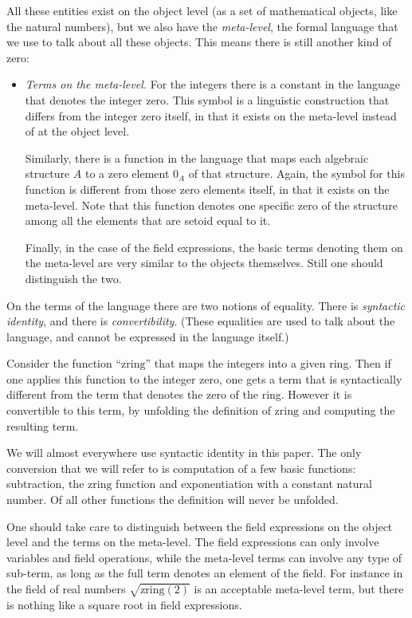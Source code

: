 \documentclass[numreferences]{kluwer}
\newcommand{\zring}{\ensuremath{\mathrm{zring}}}
\begin{document}
\begin{article}
\begin{itemize}
\end{itemize}

\noindent
All these entities exist
on the object level (as a set of mathematical objects, like
the natural numbers),
but we also have the \emph{meta-level},
the formal language that we use to talk about all these objects.
This means there is still another kind of zero:
\begin{itemize}
\item
\emph{Terms on the meta-level.}
For the integers there is a constant in the language that
denotes the integer zero.
This symbol is a linguistic construction that differs from
the integer zero itself, in that it exists on the meta-level
instead of at the object level.

Similarly, there is a function in the language that maps each
algebraic structure $A$ to a zero element $0_A$
of that structure.
Again, the symbol for this function is different from those zero elements itself,
in that it exists on the meta-level.
Note that this function denotes one specific zero of the structure
among all the elements that are setoid equal to it.

Finally, in the case of the field expressions, the basic terms denoting them
on the meta-level are very similar to the objects themselves.
Still one should distinguish the two.

\end{itemize}

\noindent
On the terms of the language there are two notions of equality.
There is \emph{syntactic identity}, and there is \emph{convertibility}.
(These equalities are used to talk about the language, and cannot
be expressed in the language itself.)

Consider the function ``$\zring$'' that maps the integers into a given ring.
Then if one applies this function to the integer zero, one gets 
a term that is syntactically different from the term that denotes the zero of
the ring.
However it is convertible to this term, by unfolding the definition of
$\zring$ and computing the resulting term.

We will almost everywhere use syntactic identity in this paper.
The only conversion that we will refer to is computation of a few
basic functions: subtraction, the $\zring$ function and exponentiation
with a constant natural number.
Of all other functions the definition will never be unfolded.

\medskip
\noindent
One should take care to distinguish between the field expressions
on the object level and the terms on the meta-level.
The field expressions can only involve variables and field operations,
while
the meta-level terms can involve any type of sub-term, as long as
the full term denotes an element of the field.
For instance in the field of real numbers $\sqrt{\zring(2)}$ is an acceptable
meta-level term,
but there is nothing like a square root in field expressions.


\end{article}
\end{document}

